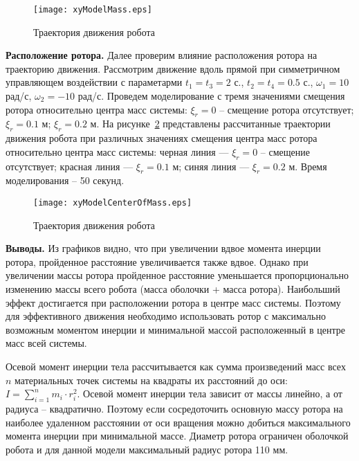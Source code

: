\begin{figure}[!ht]
	\centering
	\texttt{[image: xyModelMass.eps]}
	\caption{Траектория движения робота}
	\label{xyModelMass}
\end{figure}

\textbf{Расположение ротора.} Далее проверим влияние расположения ротора на траекторию движения. Рассмотрим движение вдоль прямой при симметричном управляющем воздействии с параметарми $t_1=t_3=2$ с., $t_2=t_4 = 0.5$ с., $\omega_1=10$ рад/с, $\omega_2=-10$ рад/с. Проведем моделирование с тремя значениями смещения ротора относительно центра масс системы: $\xi_r = 0$ -- смещение ротора отсутствует; $\xi_r = 0.1$ м; $\xi_r = 0.2$ м. На рисунке~\ref{xyModelCenterOfMass} представлены рассчитанные траектории движения робота при различных значениях смещения центра масс ротора относительно центра масс системы: черная линия --- $\xi_r = 0$ -- смещение отсутствует; красная линия ---  $\xi_r = 0.1$ м; синяя линия --- $\xi_r = 0.2$ м. Время моделирования -- 50 секунд.

\begin{figure}[!ht]
	\centering
	\texttt{[image: xyModelCenterOfMass.eps]}
	\caption{Траектория движения робота}
	\label{xyModelCenterOfMass}
\end{figure}

\textbf{Выводы.} Из графиков видно, что при увеличении вдвое момента инерции ротора, пройденное расстояние увеличивается также вдвое. Однако при увеличении массы ротора пройденное расстояние уменьшается пропорционально изменению массы всего робота (масса оболочки + масса ротора). Наибольший эффект достигается при расположении ротора в центре масс системы. Поэтому для эффективного движения необходимо использовать ротор с максимально возможным моментом инерции и минимальной массой расположенный в центре масс всей системы.

Осевой момент инерции тела рассчитывается как сумма произведений масс всех $n$ материальных точек системы на квадраты их расстояний до оси: $I = \sum \limits_{i=1}^n m_i\cdot r_i^2$. Осевой момент инерции тела зависит от массы линейно, а от радиуса -- квадратично. Поэтому если сосредоточить основную массу ротора на наиболее удаленном расстоянии от оси вращения можно добиться максимального момента инерции при минимальной массе. Диаметр ротора ограничен оболочкой робота и для данной модели максимальный радиус ротора 110 мм.




